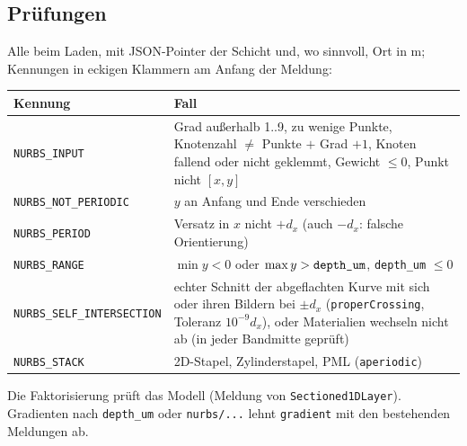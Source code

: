\subsection{Prüfungen}
Alle beim Laden, mit JSON-Pointer der Schicht und, wo sinnvoll, Ort in \textmu m; Kennungen in eckigen Klammern am
Anfang der Meldung:
\begin{center}
\small
\begin{tabular}{p{4.6cm}p{9.8cm}}
\toprule
Kennung & Fall \\
\midrule
\verb|NURBS_INPUT| & Grad außerhalb 1..9, zu wenige Punkte, Knotenzahl $\ne$ Punkte $+$ Grad $+1$, Knoten fallend oder
                     nicht geklemmt, Gewicht $\le0$, Punkt nicht $[x,y]$ \\
\verb|NURBS_NOT_PERIODIC| & $y$ an Anfang und Ende verschieden \\
\verb|NURBS_PERIOD| & Versatz in $x$ nicht $+d_x$ (auch $-d_x$: falsche Orientierung) \\
\verb|NURBS_RANGE| & $\min y<0$ oder $\max y>\verb|depth_um|$, \verb|depth_um| $\le0$ \\
\verb|NURBS_SELF_INTERSECTION| & echter Schnitt der abgeflachten Kurve mit sich oder ihren Bildern bei $\pm d_x$
                     (\verb|properCrossing|, Toleranz $10^{-9}d_x$), oder Materialien wechseln nicht ab (in jeder
                     Bandmitte geprüft) \\
\verb|NURBS_STACK| & 2D-Stapel, Zylinderstapel, PML (\verb|aperiodic|) \\
\bottomrule
\end{tabular}
\end{center}
Die Faktorisierung prüft das Modell (Meldung von \verb|Sectioned1DLayer|). Gradienten nach \verb|depth_um| oder
\verb|nurbs/...| lehnt \verb|gradient| mit den bestehenden Meldungen ab.

